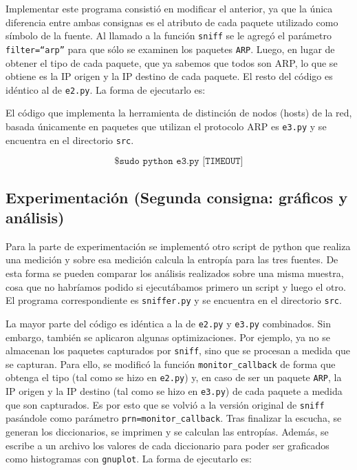 Implementar este programa consistió en modificar el anterior, ya que la única diferencia entre ambas
consignas es el atributo de cada paquete utilizado como símbolo de la fuente. Al llamado a la función \texttt{sniff}
se le agregó el parámetro \texttt{filter=``arp''} para que sólo se examinen los paquetes \texttt{ARP}. Luego, en lugar de
obtener el tipo de cada paquete, que ya sabemos que todos son ARP, lo que se obtiene es la IP origen y la IP destino de cada paquete.
El resto del código es idéntico al de \texttt{e2.py}. La forma de ejecutarlo es:

El código que implementa la herramienta de distinción de nodos (hosts) de la red, basada únicamente en paquetes que
utilizan el protocolo ARP es \texttt{e3.py} y se encuentra en el directorio \texttt{src}.

\[
\texttt{\$ sudo python e3.py [TIMEOUT]}
\]

\subsection{Experimentación (Segunda consigna: gráficos y análisis)}

Para la parte de experimentación se implementó otro script de python que realiza una medición y sobre
esa medición calcula la entropía para las tres fuentes. De esta forma se pueden comparar los análisis
realizados sobre una misma muestra, cosa que no habríamos podido si ejecutábamos primero un script y luego
el otro. El programa correspondiente es \texttt{sniffer.py} y se encuentra en el directorio \texttt{src}.

La mayor parte del código es idéntica a la de \texttt{e2.py} y \texttt{e3.py} combinados. Sin embargo,
también se aplicaron algunas optimizaciones. Por ejemplo, ya no se almacenan los paquetes capturados por
\texttt{sniff}, sino que se procesan a medida que se capturan. Para ello, se modificó la función
\texttt{monitor\_callback} de forma que obtenga el tipo (tal como se hizo en \texttt{e2.py}) y, en caso
de ser un paquete \texttt{ARP}, la IP origen y la IP destino
(tal como se hizo en \texttt{e3.py}) de cada paquete a medida que son capturados. Es por esto que se volvió
a la versión original de \texttt{sniff} pasándole como parámetro \texttt{prn=monitor\_callback}. Tras finalizar
la escucha, se generan los diccionarios, se imprimen y se calculan las entropías. Además, se escribe a un archivo
los valores de cada diccionario para poder ser graficados como histogramas con \texttt{gnuplot}. La forma de
ejecutarlo es:

